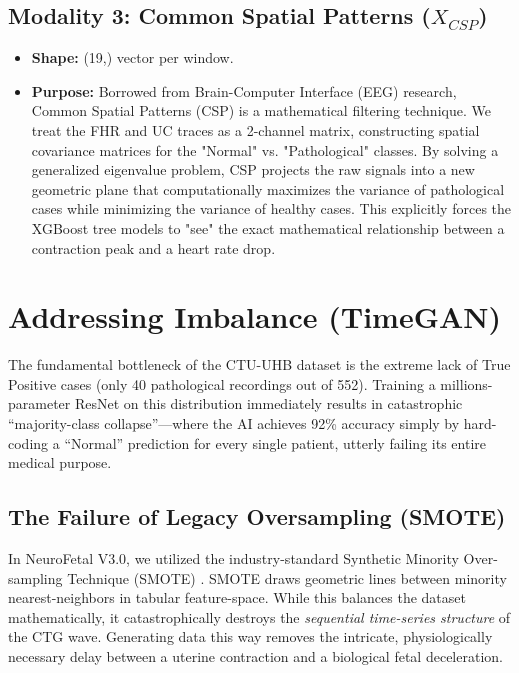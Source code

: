 \documentclass[12pt,a4paper]{report}
\begin{document}
\section{Modality 3: Common Spatial Patterns (\texorpdfstring{$X_{CSP}$}{X\_CSP})}
\begin{itemize}
    \item \textbf{Shape:} (19,) vector per window.
    \item \textbf{Purpose:} Borrowed from Brain-Computer Interface (EEG) research, Common Spatial Patterns (CSP) is a mathematical filtering technique. We treat the FHR and UC traces as a 2-channel matrix, constructing spatial covariance matrices for the "Normal" vs. "Pathological" classes. By solving a generalized eigenvalue problem, CSP projects the raw signals into a new geometric plane that computationally maximizes the variance of pathological cases while minimizing the variance of healthy cases. This explicitly forces the XGBoost tree models to "see" the exact mathematical relationship between a contraction peak and a heart rate drop.
\end{itemize}

\chapter{Addressing Imbalance (TimeGAN)}
The fundamental bottleneck of the CTU-UHB dataset is the extreme lack of True Positive cases (only 40 pathological recordings out of 552). Training a millions-parameter ResNet on this distribution immediately results in catastrophic ``majority-class collapse''---where the AI achieves 92\% accuracy simply by hard-coding a ``Normal'' prediction for every single patient, utterly failing its entire medical purpose.

\section{The Failure of Legacy Oversampling (SMOTE)}
In NeuroFetal V3.0, we utilized the industry-standard Synthetic Minority Over-sampling Technique (SMOTE) \cite{smote}. SMOTE draws geometric lines between minority nearest-neighbors in tabular feature-space. While this balances the dataset mathematically, it catastrophically destroys the \textit{sequential time-series structure} of the CTG wave. Generating data this way removes the intricate, physiologically necessary delay between a uterine contraction and a biological fetal deceleration.
\end{document}
